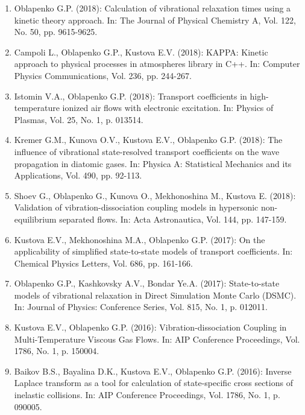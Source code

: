 \documentclass{resume} %
\begin{document}
\begin{enumerate}
\item {{Oblapenko G.P.}} (2018): Calculation of vibrational relaxation times using a kinetic theory approach. In: The Journal of Physical Chemistry A, Vol. 122, No. 50, pp. 9615-9625.

\item {Campoli L., {Oblapenko G.P.}, Kustova E.V.} (2018): KAPPA: Kinetic approach to physical processes in atmospheres library in C++. In: Computer Physics Communications, Vol. 236, pp. 244-267.

\item {Istomin V.A., {Oblapenko G.P.}} (2018): Transport coefficients in high-temperature ionized air flows with electronic excitation. In: Physics of Plasmas, Vol. 25, No. 1, p. 013514.

\item {Kremer G.M., Kunova O.V., Kustova E.V., {Oblapenko G.P.}} (2018): The influence of vibrational state-resolved transport coefficients on the wave propagation in diatomic gases. In: Physica A: Statistical Mechanics and its Applications, Vol. 490, pp. 92-113.

\item {Shoev G., {Oblapenko G.}, Kunova O., Mekhonoshina M., Kustova E.} (2018): Validation of vibration-dissociation coupling models in hypersonic non-equilibrium separated flows. In: Acta Astronautica, Vol. 144, pp. 147-159.

\item {Kustova E.V., Mekhonoshina M.A., {Oblapenko G.P.}} (2017): On the applicability of simplified state-to-state models of transport coefficients. In: Chemical Physics Letters, Vol. 686, pp. 161-166.

\item {{Oblapenko G.P.}, Kashkovsky A.V., Bondar Ye.A.} (2017): State-to-state models of vibrational relaxation in Direct Simulation Monte Carlo (DSMC). In: Journal of Physics: Conference Series, Vol. 815, No. 1, p. 012011.

\item  {Kustova E.V., {Oblapenko G.P.}} (2016): Vibration-dissociation Coupling in Multi-Temperature Viscous Gas Flows. In: AIP Conference Proceedings, Vol. 1786, No. 1, p. 150004.

\item  {Baikov B.S., Bayalina D.K., Kustova E.V., {Oblapenko G.P.}} (2016): Inverse Laplace transform as a tool for calculation of state-specific cross sections of inelastic collisions. In: AIP Conference Proceedings, Vol. 1786, No. 1, p. 090005.


\end{enumerate}
\end{document}
